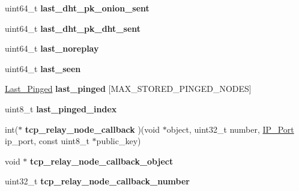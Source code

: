 \begin{DoxyCompactItemize}
\item 
\hypertarget{struct_onion___friend_ac83f72b06d86503ee29943ccbe7f1a7a}{uint64\+\_\+t {\bfseries last\+\_\+dht\+\_\+pk\+\_\+onion\+\_\+sent}}\label{struct_onion___friend_ac83f72b06d86503ee29943ccbe7f1a7a}

\item 
\hypertarget{struct_onion___friend_a412168e37e1bdf5545f814c9c487aaeb}{uint64\+\_\+t {\bfseries last\+\_\+dht\+\_\+pk\+\_\+dht\+\_\+sent}}\label{struct_onion___friend_a412168e37e1bdf5545f814c9c487aaeb}

\item 
\hypertarget{struct_onion___friend_afeea50a96c079a530de60cf6389ec1bd}{uint64\+\_\+t {\bfseries last\+\_\+noreplay}}\label{struct_onion___friend_afeea50a96c079a530de60cf6389ec1bd}

\item 
\hypertarget{struct_onion___friend_a7418e248decb1dc63d1e1c8960092c33}{uint64\+\_\+t {\bfseries last\+\_\+seen}}\label{struct_onion___friend_a7418e248decb1dc63d1e1c8960092c33}

\item 
\hypertarget{struct_onion___friend_a27015cced65360814a59652b662ef143}{\hyperlink{struct_last___pinged}{Last\+\_\+\+Pinged} {\bfseries last\+\_\+pinged} \mbox{[}M\+A\+X\+\_\+\+S\+T\+O\+R\+E\+D\+\_\+\+P\+I\+N\+G\+E\+D\+\_\+\+N\+O\+D\+E\+S\mbox{]}}\label{struct_onion___friend_a27015cced65360814a59652b662ef143}

\item 
\hypertarget{struct_onion___friend_a6e0a5214a3dffa151dd52dc4c230145b}{uint8\+\_\+t {\bfseries last\+\_\+pinged\+\_\+index}}\label{struct_onion___friend_a6e0a5214a3dffa151dd52dc4c230145b}

\item 
\hypertarget{struct_onion___friend_a62001c45ecd44d4c6321ca2358f4df5f}{int($\ast$ {\bfseries tcp\+\_\+relay\+\_\+node\+\_\+callback} )(void $\ast$object, uint32\+\_\+t number, \hyperlink{struct_i_p___port}{I\+P\+\_\+\+Port} ip\+\_\+port, const uint8\+\_\+t $\ast$public\+\_\+key)}\label{struct_onion___friend_a62001c45ecd44d4c6321ca2358f4df5f}

\item 
\hypertarget{struct_onion___friend_a0da74cebd5ec2859b1de5db74c0dc528}{void $\ast$ {\bfseries tcp\+\_\+relay\+\_\+node\+\_\+callback\+\_\+object}}\label{struct_onion___friend_a0da74cebd5ec2859b1de5db74c0dc528}

\item 
\hypertarget{struct_onion___friend_ab673fb84fe578fb5e7848f9f04c093cf}{uint32\+\_\+t {\bfseries tcp\+\_\+relay\+\_\+node\+\_\+callback\+\_\+number}}\label{struct_onion___friend_ab673fb84fe578fb5e7848f9f04c093cf}


\end{DoxyCompactItemize}
